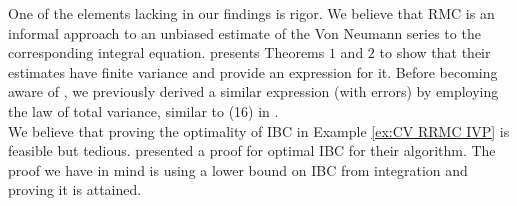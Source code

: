 \documentclass[a4paper,12pt]{article}
\begin{document}
One of the elements lacking in our findings is rigor.  We believe
that RMC is an informal approach to an unbiased estimate of
the Von Neumann series to the corresponding integral equation.
\cite{ermakov_monte_2021} presents Theorems $1$ and $2$ to
show that their estimates have finite variance and provide an expression for it.
Before becoming aware of \cite{ermakov_monte_2021}, we
previously derived a similar expression (with errors)
by employing the law of total variance, similar to (16) in \cite{rath_ears_2022}. \\
We believe that proving the optimality of IBC in Example \ref{ex:CV RRMC IVP} is feasible
but tedious.
\cite{daun_randomized_2011} presented a proof for optimal IBC for their algorithm.
The proof we have in mind is using a lower bound on IBC
from integration and proving it is attained.\\




\newpage
\begin{abstract}
  
\end{abstract}

\printbibliography
\newpage
\end{document}
